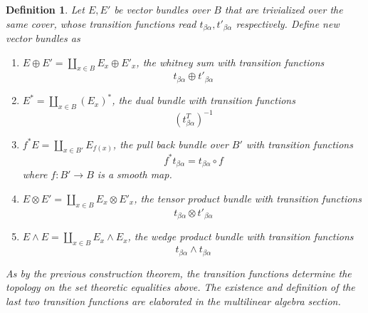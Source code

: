\documentclass{article}
\numberwithin{theorem}{section}
\newtheorem{definition}[theorem]{Definition}
\newcommand{\K}{\mathbb{K}}
\newcommand{\1}{\mathds{1}}
\begin{document}
\begin{definition}
    Let $E, E'$ be vector bundles over $B$ that are trivialized over the same cover, whose transition functions read $t_{\beta \alpha}, t'_{\beta \alpha}$ respectively. Define new vector bundles as 
    \begin{enumerate}
        \item $E \oplus E' = \coprod_{x \in B} E_x \oplus E'_x  $, the whitney sum with transition functions 
        \[ t_{\beta \alpha} \oplus t'_{\beta \alpha} \]
        \item $E^* = \coprod_{x \in B} (E_x)^*$,  the dual bundle with transition functions 
        \[ (t^T_{\beta \alpha})^{-1} \]
        \item $f^*E = \coprod_{x \in B'} E_{f(x)}$, the pull back bundle over $B'$ with transition functions 
        \[ f^* t_{\beta \alpha} = t_{\beta \alpha} \circ f \]
        where $f: B' \to B$ is a smooth map. 
        \item $E \otimes E' = \coprod_{x \in B} E_x \otimes E'_x $, the tensor product bundle with transition functions 
        \[ t_{\beta \alpha} \otimes t'_{\beta \alpha} \]
        \item $E \wedge E = \coprod_{x \in B} E_x \wedge E_x $, the wedge product bundle with transition functions 
        \[ t_{\beta \alpha} \wedge t_{\beta \alpha} \]
    \end{enumerate}
    As by the previous construction theorem, the transition functions determine the topology on the set theoretic equalities above. The existence and definition of the last two transition functions are elaborated in the multilinear algebra section. 

\end{definition}

\iffalse 
(i): by consdering the set and the diffeomorphisms: 
The tensor product bundle $E\otimes F$ is defined as the set of tensor products of the respective fibers  
\[ E\otimes F := \bigcup_{x \in B} E_x \otimes_{\mathbb{K}} F_x  \]
where the trivialization is given by 
\[ (\Phi \otimes \Psi) (\sum_{ij}\lambda^{ij}v_i \otimes w_j) = (x, \sum_{ij}\lambda^{ij}pr_2(\Phi(v_i))\otimes pr_2(\Psi(w_j)))  \in \{ x\} \times (\K^r \otimes \K^s) \]


(ii): by considering the gluing construction 
\[ E\otimes F := \coprod_{\alpha} U_\alpha \times (\K^r \otimes \K^s) /\sim \]
where 
\[ \left[\left(\alpha, x, \sum_{ij}\lambda^{ij}v_i\otimes w_j \right)\right] = \left[\left(\beta, x,\sum_{ij}\lambda^{ij}g_{\beta \alpha}v_i \otimes h_{\beta \alpha} w_j\right)\right] \]
\fi 
\end{document}
